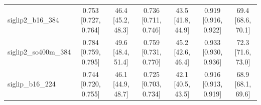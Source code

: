 \begin{table}[t]
\begin{tabular}{lcccccc}
siglip2\_b16\_384 & 0.753 [0.727, 0.764] & 46.4 [45.2, 48.3] & 0.736 [0.711, 0.746] & 43.5 [41.8, 44.9] & 0.919 [0.916, 0.922] & 69.4 [68.6, 70.1] \\
siglip2\_so400m\_384 & 0.784 [0.759, 0.795] & 49.6 [48.4, 51.4] & 0.759 [0.731, 0.770] & 45.2 [42.6, 46.4] & 0.933 [0.930, 0.936] & 72.3 [71.6, 73.0] \\
siglip\_b16\_224 & 0.744 [0.720, 0.755] & 46.1 [44.9, 48.7] & 0.725 [0.703, 0.734] & 42.1 [40.5, 43.5] & 0.916 [0.913, 0.919] & 68.9 [68.1, 69.6] \\
\bottomrule\end{tabular}
\end{table}

